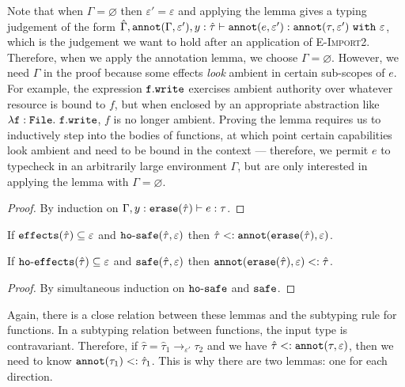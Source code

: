 Note that when $\Gamma = \varnothing$ then $\varepsilon' = \varepsilon$ and applying the lemma gives a typing judgement of the form $\hat \Gamma, \mathtt{annot}(\Gamma, \varepsilon'), y: \hat \tau \vdash \mathtt{annot}(e, \varepsilon') : \mathtt{annot}(\tau, \varepsilon')~\mathtt{with}~ \varepsilon$, which is the judgement we want to hold after an application of \textsc{E-Import2}. Therefore, when we apply the annotation lemma, we choose $\Gamma = \varnothing$. However, we need $\Gamma$ in the proof because some effects \textit{look} ambient in certain sub-scopes of $e$. For example, the expression $\mathtt{f.write}$ exercises ambient authority over whatever resource is bound to $f$, but when enclosed by an appropriate abstraction like $\mathtt{\lambda f: {File}.~f.write}$, $f$ is no longer ambient. Proving the lemma requires us to inductively step into the bodies of functions, at which point certain capabilities look ambient and need to be bound in the context --- therefore, we permit $e$ to typecheck in an arbitrarily large environment $\Gamma$, but are only interested in applying the lemma with $\Gamma = \varnothing$.

\begin{proof}
By induction on $\Gamma, y: \mathtt{erase}(\hat \tau) \vdash e: \tau$.
\end{proof}

\begin{lemma}
If $\mathtt{effects}(\hat \tau) \subseteq \varepsilon$ and $\mathtt{ho \hbox{-} safe}(\hat \tau, \varepsilon)$ then $\hat \tau <: \mathtt{annot}(\mathtt{erase}(\hat \tau), \varepsilon)$.
\end{lemma}

\begin{lemma}
If $\mathtt{ho \hbox{-} effects}(\hat \tau) \subseteq \varepsilon$ and $\mathtt{safe}(\hat \tau, \varepsilon)$ then $\mathtt{annot(erase}(\hat \tau), \varepsilon) <: \hat \tau$.
\end{lemma}

\begin{proof}
By simultaneous induction on $\mathtt{ho \hbox{-} safe}$ and $\mathtt{safe}$.
\end{proof}

\noindent
Again, there is a close relation between these lemmas and the subtyping rule for functions. In a subtyping relation between functions, the input type is contravariant. Therefore, if $\hat \tau = \hat \tau_1 \rightarrow_{\varepsilon'} \tau_2$ and we have $\hat \tau <: \mathtt{annot}(\tau, \varepsilon)$, then we need to know $\mathtt{annot}(\tau_1) <: \hat \tau_1$. This is why there are two lemmas: one for each direction.

